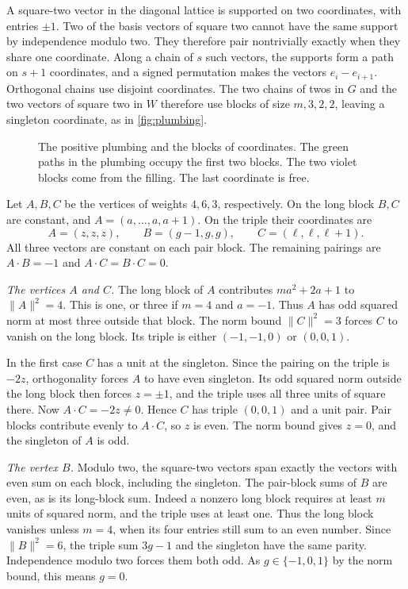 \documentclass[a4paper,11pt]{amsart}
\numberwithin{equation}{subsection}
\theoremstyle{plain}
\theoremstyle{remark}
\begin{document}
A square-two vector in the diagonal lattice is supported on two coordinates, with entries $\pm1$. Two of the basis vectors of square two cannot have the same support by independence modulo two. They therefore pair nontrivially exactly when they share one coordinate. Along a chain of $s$ such vectors, the supports form a path on $s+1$ coordinates, and a signed permutation makes the vectors $e_i-e_{i+1}$. Orthogonal chains use disjoint coordinates. The two chains of twos in $G$ and the two vectors of square two in $W$ therefore use blocks of size $m,3,2,2$, leaving a singleton coordinate, as in \autoref{fig:plumbing}.

\begin{figure}[!ht]
\centering

\caption{The positive plumbing and the blocks of coordinates. The green paths in the plumbing occupy the first two blocks. The two violet blocks come from the filling. The last coordinate is free.}
\label{fig:plumbing}
\end{figure}

Let $A,B,C$ be the vertices of weights $4,6,3$, respectively. On the long block $B,C$ are constant, and $A=(a,\ldots,a,a+1)$. On the triple their coordinates are
\[
A=(z,z,z),\qquad B=(g-1,g,g),\qquad C=(\ell,\ell,\ell+1).
\]
All three vectors are constant on each pair block. The remaining pairings are $A\cdot B=-1$ and $A\cdot C=B\cdot C=0$.

\smallskip
\noindent\textit{The vertices $A$ and $C$.}
The long block of $A$ contributes $ma^2+2a+1$ to $\lVert A\rVert^2=4$. This is one, or three if $m=4$ and $a=-1$. Thus $A$ has odd squared norm at most three outside that block. The norm bound $\lVert C\rVert^2=3$ forces $C$ to vanish on the long block. Its triple is either $(-1,-1,0)$ or $(0,0,1)$.

In the first case $C$ has a unit at the singleton. Since the pairing on the triple is $-2z$, orthogonality forces $A$ to have even singleton. Its odd squared norm outside the long block then forces $z=\pm1$, and the triple uses all three units of square there. Now $A\cdot C=-2z\ne0$. Hence $C$ has triple $(0,0,1)$ and a unit pair. Pair blocks contribute evenly to $A\cdot C$, so $z$ is even. The norm bound gives $z=0$, and the singleton of $A$ is odd.

\smallskip
\noindent\textit{The vertex $B$.}
Modulo two, the square-two vectors span exactly the vectors with even sum on each block, including the singleton. The pair-block sums of $B$ are even, as is its long-block sum. Indeed a nonzero long block requires at least $m$ units of squared norm, and the triple uses at least one. Thus the long block vanishes unless $m=4$, when its four entries still sum to an even number. Since $\lVert B\rVert^2=6$, the triple sum $3g-1$ and the singleton have the same parity. Independence modulo two forces them both odd. As $g\in\{-1,0,1\}$ by the norm bound, this means $g=0$.
\end{document}

